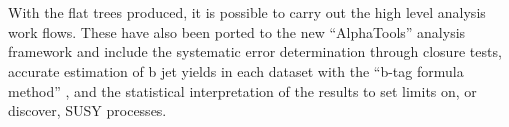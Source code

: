 \\\\
With the flat trees produced, it is possible to carry out the high level analysis work flows. These have also been ported to the new ``AlphaTools'' analysis framework and include the systematic error determination through closure tests, accurate estimation of b jet yields in each dataset with the ``b-tag formula method'' \cite{btagFormula}, and the statistical interpretation of the results to set limits on, or discover, SUSY processes.